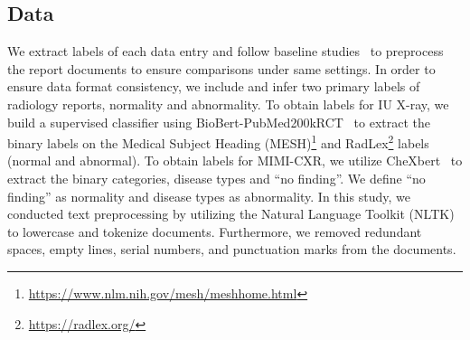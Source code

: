 \documentclass[sn-mathphys-num]{sn-jnl}%
\theoremstyle{thmstyleone}%
\theoremstyle{thmstyletwo}%
\theoremstyle{thmstylethree}%
\begin{document}




\begin{appendices}
\section{Data}
\label{appendix:sec:data}

We extract labels of each data entry and follow baseline studies~\cite{chen2020generating, chen2021cross, qin2022reinforced} to preprocess the report documents to ensure comparisons under same settings.
In order to ensure data format consistency, we include and infer two primary labels of radiology reports, normality and abnormality.
To obtain labels for IU X-ray, we build a supervised classifier using BioBert-PubMed200kRCT~\cite{deka2022evidence} to extract the binary labels on the Medical Subject Heading (MESH)\footnote{\url{https://www.nlm.nih.gov/mesh/meshhome.html}} and RadLex\footnote{\url{https://radlex.org/}} labels (normal and abnormal).
To obtain labels for MIMI-CXR, we utilize CheXbert~\cite{smit2020combining} to extract the binary categories, disease types and ``no finding''. 
We define ``no finding'' as normality and disease types as abnormality.
In this study, we conducted text preprocessing by utilizing the Natural Language Toolkit (NLTK)~\cite{bird2004nltk} to lowercase and tokenize documents.
Furthermore, we removed redundant spaces, empty lines, serial numbers, and punctuation marks from the documents.



\end{appendices}
\end{document}
